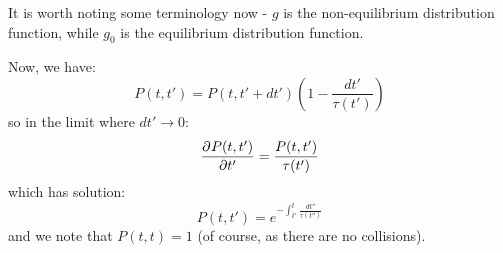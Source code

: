 It is worth noting some terminology now - $g$ is the non-equilibrium distribution function, while $g_0$ is the equilibrium distribution function.

Now, we have:
\begin{equation}
    P(t, t') = P(t, t' + dt')\left(1 - \frac{dt'}{\tau(t')}\right)
\end{equation}
so in the limit where $dt' \to 0$:
\begin{equation}
    \dpd{P(t, t')}{t'} = \frac{P(t, t')}{\tau(t')}
\end{equation}
which has solution:
\begin{equation}
    P(t, t') = e^{-\int_{t'}^t \frac{dt''}{\tau(t'')}}
\end{equation}
and we note that $P(t, t) = 1$ (of course, as there are no collisions).

